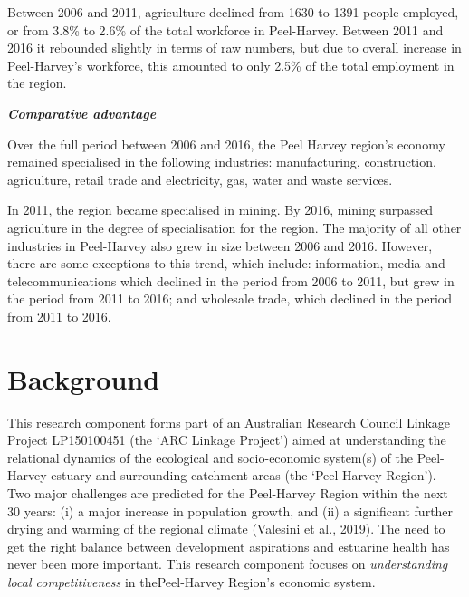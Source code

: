 \documentclass[
]{book}
\begin{document}
Between 2006 and 2011, agriculture declined from 1630 to 1391 people employed, or from 3.8\% to 2.6\% of the total workforce in Peel-Harvey. Between 2011 and 2016 it rebounded slightly in terms of raw numbers, but due to overall increase in Peel-Harvey's workforce, this amounted to only 2.5\% of the total employment in the region.

\textbf{\emph{Comparative advantage}}

Over the full period between 2006 and 2016, the Peel Harvey region's economy remained specialised in the following industries: manufacturing, construction, agriculture, retail trade and electricity, gas, water and waste services.~

In 2011, the region became specialised in mining. By 2016, mining surpassed agriculture in the degree of specialisation for the region. The majority of all other industries in Peel-Harvey also grew in size between 2006 and 2016. However, there are some exceptions to this trend, which include: information, media and telecommunications which declined in the period from 2006 to 2011, but grew in the period from 2011 to 2016; and wholesale trade, which declined in the period from 2011 to 2016.~

\hypertarget{background-5}{%
\section{Background}\label{background-5}}

This research component forms part of an Australian Research Council Linkage Project LP150100451 (the `ARC Linkage Project') aimed at understanding the relational dynamics of the ecological and socio-economic system(s) of the Peel-Harvey estuary and surrounding catchment areas (the `Peel-Harvey Region'). Two major challenges are predicted for the Peel-Harvey Region within the next 30 years: (i) a major increase in population growth, and (ii) a significant further drying and warming of the regional climate (Valesini et al., 2019). The need to get the right balance between development aspirations and estuarine health has never been more important. This research component focuses on \emph{understanding local competitiveness} in thePeel-Harvey Region's economic system.~
\end{document}
